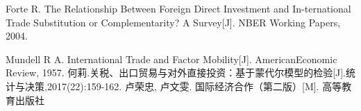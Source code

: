 \documentclass{article}
\begin{document}
{		
\begin{thebibliography}{99}

	 Forte R. The Relationship Between Foreign Direct Investment and In-ternational Trade Substitution or Complementarity? A Survey[J]. NBER Working Papers, 2004.
	 
	 Mundell R A. International Trade and Factor Mobility[J]. AmericanEconomic Review, 1957.
    何莉.关税、出口贸易与对外直接投资：基于蒙代尔模型的检验[J].统计与决策,2017(22):159-162.
    卢荣忠, 卢文雯. 国际经济合作（第二版）[M]. 高等教育出版社
   
   
    
\end{thebibliography}




}%



\end{document}
